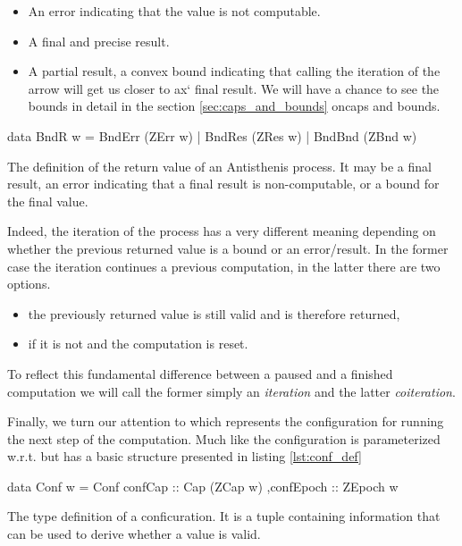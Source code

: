 \begin{itemize}
\item An error indicating that the value is not computable.
\item A final and precise result.
\item A partial result, a convex bound indicating that calling the
  iteration of the arrow will get us closer to ax` final result. We will
  have a chance to see the bounds in detail in the section
  \ref{sec:caps_and_bounds} oncaps and bounds.
\end{itemize}


\begin{code}
\begin{haskellcode}
data BndR w
  = BndErr (ZErr w)
  | BndRes (ZRes w)
  | BndBnd (ZBnd w)
\end{haskellcode}
  \caption{\label{lst:bnd_def}The definition of the return value of an
    Antisthenis process. It may be a final result, an error indicating
    that a final result is non-computable, or a bound for the final
    value.}
\end{code}

Indeed, the iteration of the process has a very different meaning
depending on whether the previous returned value is a bound or an
error/result. In the former case the iteration continues a previous
computation, in the latter there are two options.

\begin{itemize}
\item the previously returned value is still valid and is therefore
  returned,
\item if it is not and the computation is reset.
\end{itemize}

To reflect this fundamental difference between a paused and a finished
computation we will call the former simply an \emph{iteration} and the
latter \emph{coiteration}.

Finally, we turn our attention to  which represents the
configuration for running the next step of the computation. Much like
 the configuration is parameterized w.r.t.  but has
a basic structure presented in listing \ref{lst:conf_def}

\begin{code}
\begin{haskellcode}
data Conf w =
  Conf { confCap :: Cap (ZCap w)
        ,confEpoch :: ZEpoch w
       }
\end{haskellcode}
  \caption{\label{lst:conf_def}The type definition of a
    conficuration. It is a tuple containing information that can be
    used to derive whether a value is valid.}
\end{code}


